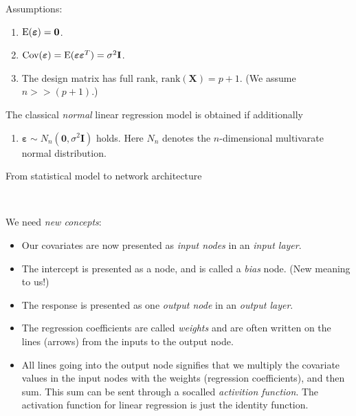 \documentclass[10pt,ignorenonframetext,]{beamer}
\providecommand{\tightlist}{%
  \setlength{\itemsep}{0pt}\setlength{\parskip}{0pt}}
\begin{document}
\begin{frame}

Assumptions:

\begin{enumerate}
\def\labelenumi{\arabic{enumi}.}
\tightlist
\item
  \(\text{E}(\boldsymbol{\varepsilon})=\bf{0}\).
\item
  \(\text{Cov}(\boldsymbol{\varepsilon})=\text{E}(\boldsymbol{\varepsilon}\boldsymbol{\varepsilon}^T)=\sigma^2\bf{I}\).
\item
  The design matrix has full rank, \(\text{rank}({\boldsymbol X})=p+1\).
  (We assume \(n>>(p+1)\).)
\end{enumerate}

The classical \emph{normal} linear regression model is obtained if
additionally

\begin{enumerate}
\def\labelenumi{\arabic{enumi}.}
\setcounter{enumi}{3}
\tightlist
\item
  \(\boldsymbol\varepsilon\sim N_n({\boldsymbol 0},\sigma^2 {\boldsymbol I})\)
  holds. Here \(N_n\) denotes the \(n\)-dimensional multivarate normal
  distribution.
\end{enumerate}

\end{frame}

\begin{frame}

\begin{block}{From statistical model to network architecture}

\(~\)

We need \emph{new concepts}:

\begin{itemize}
\item
  Our covariates are now presented as \emph{input nodes} in an
  \emph{input layer}.
\item
  The intercept is presented as a node, and is called a \emph{bias}
  node. (New meaning to us!)
\item
  The response is presented as one \emph{output node} in an \emph{output
  layer}.
\item
  The regression coefficients are called \emph{weights} and are often
  written on the lines (arrows) from the inputs to the output node.
\item
  All lines going into the output node signifies that we multiply the
  covariate values in the input nodes with the weights (regression
  coefficients), and then sum. This sum can be sent through a socalled
  \emph{activition function}. The activation function for linear
  regression is just the identity function.
\end{itemize}

\end{block}

\end{frame}
\end{document}
